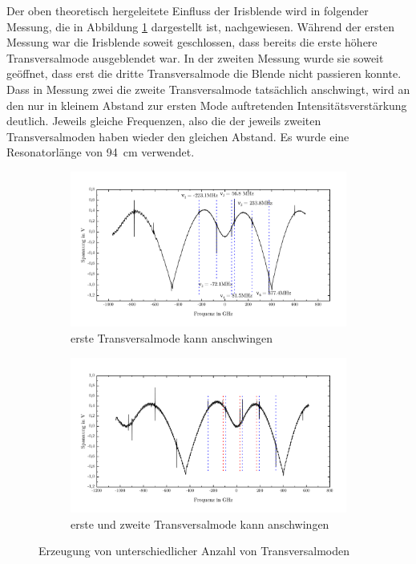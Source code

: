 \documentclass[a4paper,twoside,final]{article}
\begin{document}
\FloatBarrier

Der oben theoretisch hergeleitete Einfluss der Irisblende wird in folgender Messung, die in Abbildung \ref{fig:Transversalmoden} dargestellt ist, nachgewiesen. Während der ersten Messung war die Irisblende soweit geschlossen, dass bereits die erste höhere Transversalmode ausgeblendet war. In der zweiten Messung wurde sie soweit geöffnet, dass erst die dritte Transversalmode die Blende nicht passieren konnte. Dass in Messung zwei die zweite Transversalmode tatsächlich anschwingt, wird an den nur in kleinem Abstand zur ersten Mode auftretenden Intensitätsverstärkung deutlich. Jeweils gleiche Frequenzen, also die der jeweils zweiten Transversalmoden haben wieder den gleichen Abstand. Es wurde eine Resonatorlänge von \SI{94}{\centi\meter} verwendet.

\begin{figure}[htp]
  \centering
  \begin{subfigure}{0.8\textwidth}
    \includegraphics[width=\textwidth]{Bilder/1TransversaleMode_94cm.pdf}
    \caption{erste Transversalmode kann anschwingen}
  \end{subfigure}
  \begin{subfigure}{0.8\textwidth}
    \includegraphics[width=\textwidth]{Bilder/2TransversaleModen_94cm.pdf}
    \caption{erste und zweite Transversalmode kann anschwingen}
  \end{subfigure}
  \caption{Erzeugung von unterschiedlicher Anzahl von Transversalmoden}
  \label{fig:Transversalmoden}
\end{figure}
\FloatBarrier
\end{document}
